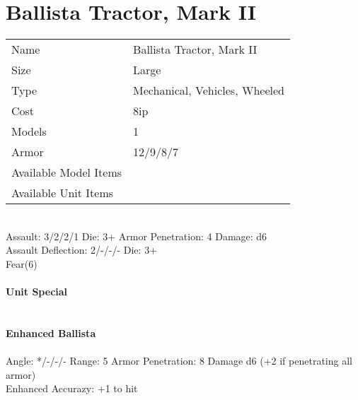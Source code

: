 






\pagebreak

\section{ Ballista Tractor, Mark II }

\begin{tabular}{ll}
  Name & Ballista Tractor, Mark II \\
  Size & Large\\
  Type & Mechanical, Vehicles, Wheeled\\
  Cost & 8ip\\
  Models & 1\\
  Armor & 12/9/8/7\\
  Available Model Items &  \\
  Available Unit Items &  \\
\end{tabular}

\ \\
Assault: 3/2/2/1 Die: 3+ Armor Penetration: 4 Damage: d6 \\
Assault Deflection: 2/-/-/- Die: 3+\\
\indent Fear(6) \\
\ \\

{\bf Unit Special} \\

\ \\
\ \\
{\bf Enhanced Ballista } \\
\ \\
Angle: */-/-/- Range: 5 Armor Penetration: 8 Damage d6 (+2 if penetrating all armor) \\
\indent Enhanced Accurazy: +1 to hit \\






